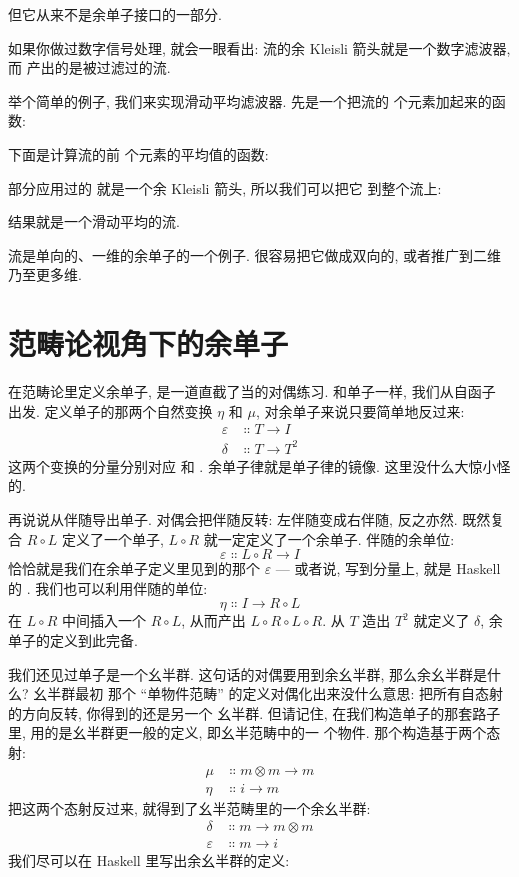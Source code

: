 但它从来不是余单子接口的一部分.

如果你做过数字信号处理, 就会一眼看出: 流的余 Kleisli 箭头就是一个数字滤波器, 而
 产出的是被过滤过的流.

举个简单的例子, 我们来实现滑动平均滤波器. 先是一个把流的  个元素加起来的函数:

下面是计算流的前  个元素的平均值的函数:

部分应用过的  就是一个余 Kleisli 箭头, 所以我们可以把它 
到整个流上:

结果就是一个滑动平均的流.

流是单向的、一维的余单子的一个例子. 很容易把它做成双向的, 或者推广到二维乃至更多维.

\section{范畴论视角下的余单子}

在范畴论里定义余单子, 是一道直截了当的对偶练习. 和单子一样, 我们从自函子  出发.
定义单子的那两个自然变换 $\eta$ 和 $\mu$, 对余单子来说只要简单地反过来:
\begin{align*}
  \varepsilon & \Colon T \to I   \\
  \delta      & \Colon T \to T^2
\end{align*}
这两个变换的分量分别对应  和 . 余单子律就是单子律的镜像.
这里没什么大惊小怪的.

再说说从伴随导出单子. 对偶会把伴随反转: 左伴随变成右伴随, 反之亦然. 既然复合
$R \circ L$ 定义了一个单子, $L \circ R$ 就一定定义了一个余单子. 伴随的余单位:
\[\varepsilon \Colon L \circ R \to I\]
恰恰就是我们在余单子定义里见到的那个 $\varepsilon$ --- 或者说, 写到分量上, 就是 Haskell
的 . 我们也可以利用伴随的单位:
\[\eta \Colon I \to R \circ L\]
在 $L \circ R$ 中间插入一个 $R \circ L$, 从而产出 $L \circ R \circ L \circ R$.
从 $T$ 造出 $T^2$ 就定义了 $\delta$, 余单子的定义到此完备.

我们还见过单子是一个幺半群. 这句话的对偶要用到余幺半群, 那么余幺半群是什么? 幺半群最初
那个 ``单物件范畴'' 的定义对偶化出来没什么意思: 把所有自态射的方向反转, 你得到的还是另一个
幺半群. 但请记住, 在我们构造单子的那套路子里, 用的是幺半群更一般的定义, 即幺半范畴中的一
个物件. 那个构造基于两个态射:
\begin{align*}
  \mu  & \Colon m \otimes m \to m \\
  \eta & \Colon i \to m
\end{align*}
把这两个态射反过来, 就得到了幺半范畴里的一个余幺半群:
\begin{align*}
  \delta      & \Colon m \to m \otimes m \\
  \varepsilon & \Colon m \to i
\end{align*}
我们尽可以在 Haskell 里写出余幺半群的定义:

